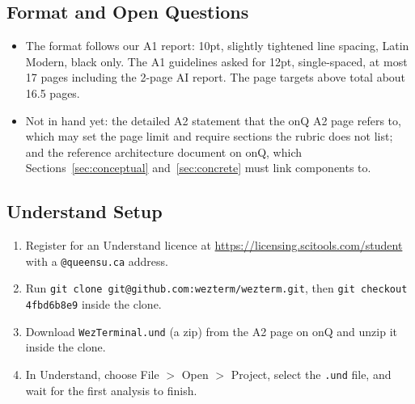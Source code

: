 \subsection*{Format and Open Questions}

\begin{itemize}[itemsep=1pt]
  \item The format follows our A1 report: 10pt, slightly tightened line spacing, Latin Modern, black only. The A1 guidelines asked for 12pt, single-spaced, at most 17 pages including the 2-page AI report. The page targets above total about 16.5 pages.
  \item Not in hand yet: the detailed A2 statement that the onQ A2 page refers to, which may set the page limit and require sections the rubric does not list; and the reference architecture document on onQ, which Sections~\ref{sec:conceptual} and~\ref{sec:concrete} must link components to.
\end{itemize}

\subsection*{Understand Setup}

\begin{enumerate}[itemsep=1pt]
  \item Register for an Understand licence at \url{https://licensing.scitools.com/student} with a \texttt{@queensu.ca} address.
  \item Run \texttt{git clone git@github.com:wezterm/wezterm.git}, then \texttt{git checkout 4fbd6b8e9} inside the clone.
  \item Download \texttt{WezTerminal.und} (a zip) from the A2 page on onQ and unzip it inside the clone.
  \item In Understand, choose File $>$ Open $>$ Project, select the \texttt{.und} file, and wait for the first analysis to finish.
\end{enumerate}
